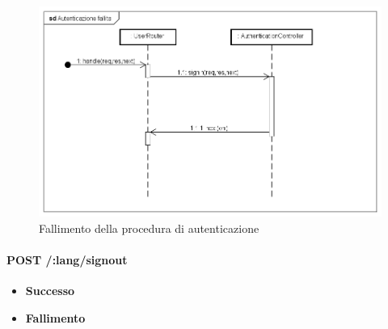 \begin{itemize}
\label{Fallimento della procedura di autenticazione}
\begin{figure}[ht]
	\centering
	\includegraphics[scale=0.40]{UML/DiagrammiDiSequenza/Back-end/POST__lang_signin_failure.png}
	\caption{Fallimento della procedura di autenticazione}
\end{figure}
\FloatBarrier

\end{itemize}

\paragraph{POST /:lang/signout}
\begin{itemize}
\item \textbf{Successo}
\item \textbf{Fallimento}
\end{itemize}